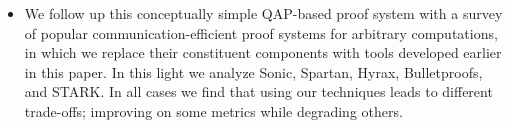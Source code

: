 \begin{itemize}
    \item[]  We follow up this conceptually simple QAP-based proof system with a survey of popular communication-efficient proof systems for arbitrary computations, in which we replace their constituent components with tools developed earlier in this paper. In this light we analyze Sonic, Spartan, Hyrax, Bulletproofs, and STARK. In all cases we find that using our techniques leads to different trade-offs; improving on some metrics while degrading others.
\end{itemize}
\fi 

